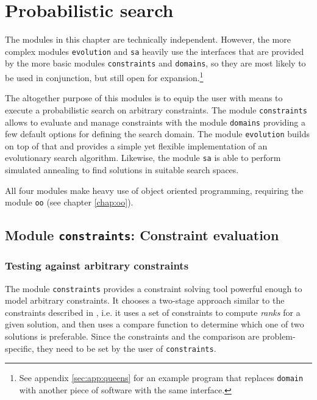 \chapter{Probabilistic search}

The modules in this chapter are technically independent. However, the more complex modules \texttt{evolution} and \texttt{sa} heavily use the interfaces that are provided by the more basic modules \texttt{constraints} and \texttt{domains}, so they are most likely to be used in conjunction, but still open for expansion.\footnote{See appendix \ref{sec:app:queens} for an example program that replaces \texttt{domain} with another piece of software with the same interface.}

The altogether purpose of this modules is to equip the user with means to execute a probabilistic search on arbitrary constraints. The module \texttt{constraints} allows to evaluate and manage constraints with the module \texttt{domains} providing a few default options for defining the search domain. The module \texttt{evolution} builds on top of that and provides a simple yet flexible implementation of an evolutionary search algorithm. Likewise, the module \texttt{sa} is able to perform simulated annealing to find solutions in suitable search spaces.

All four modules make heavy use of object oriented programming, requiring the module \texttt{oo} (see chapter \ref{chap:oo}).

\section{Module \texttt{constraints}: Constraint evaluation}
\label{sec:evolution:constraints}

\subsection{Testing against arbitrary constraints}

The module \texttt{constraints} provides a constraint solving tool powerful enough to model arbitrary constraints. It chooses a two-stage approach similar to the constraints described in \cite{HoelzlMeierWirsing2009}, i.e. it uses a set of constraints to compute \emph{ranks} for a given solution, and then uses a compare function to determine which one of two solutions is preferable. Since the constraints and the comparison are problem-specific, they need to be set by the user of \texttt{constraints}.

